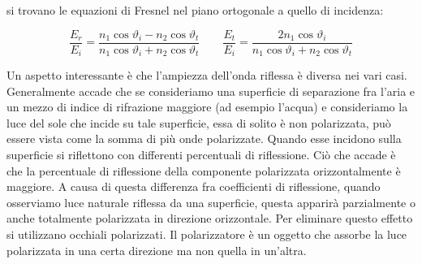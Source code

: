 si trovano le equazioni di Fresnel nel piano ortogonale a quello di incidenza:

\[
	\boxed{\frac{E_r}{E_i} = \frac{n_1\cos \vartheta_i-n_2\cos \vartheta_t}{n_1\cos \vartheta_i + n_2\cos \vartheta_t}}\qquad
	\boxed{\frac{E_t}{E_i} = \frac{2n_1\cos \vartheta_i}{n_1\cos \vartheta_i + n_2\cos \vartheta_t}}
\]

Un aspetto interessante è che l'ampiezza dell'onda riflessa è diversa nei vari casi. Generalmente accade che se consideriamo una superficie di separazione fra l'aria e un mezzo di indice di rifrazione maggiore (ad esempio l'acqua) e consideriamo la luce del sole che incide su tale superficie, essa di solito è non polarizzata, può essere vista come la somma di più onde polarizzate. Quando esse incidono sulla superficie si riflettono con differenti percentuali di riflessione. Ciò che accade è che la percentuale di riflessione della componente polarizzata orizzontalmente è maggiore. A causa di questa differenza fra coefficienti di riflessione, quando osserviamo luce naturale riflessa da una superficie, questa apparirà parzialmente o anche totalmente polarizzata in direzione orizzontale. Per eliminare questo effetto si utilizzano occhiali polarizzati. Il polarizzatore è un oggetto che assorbe la luce polarizzata in una certa direzione ma non quella in un'altra.

